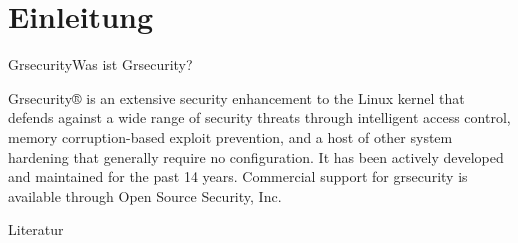 

\mode*
\begin{frame}
	\titlepage
\end{frame}

\begin{frame}
	\tableofcontents
\end{frame}

\section{Einleitung}
\begin{frame}{Grsecurity}{Was ist Grsecurity?}
	\begin{Definition} %
    		Grsecurity® is an extensive security enhancement to the Linux kernel that defends against a wide range of security threats through intelligent access control, memory corruption-based exploit prevention, and a host of other system hardening that generally require no configuration. It has been actively developed and maintained for the past 14 years. Commercial support for grsecurity is available through Open Source Security, Inc. \cite{grsechp}
	\end{Definition}
\end{frame}
\begin{frame}{Literatur}
    
    
\end{frame}


